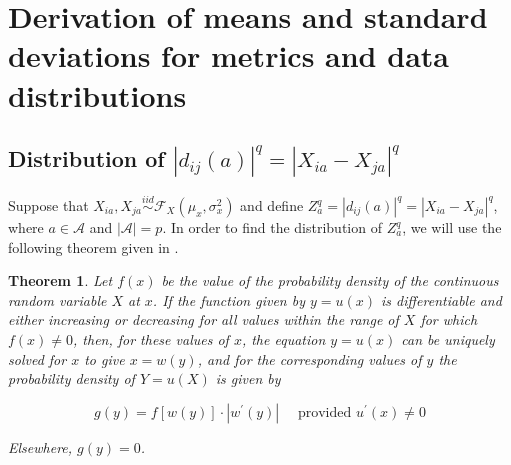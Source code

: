 \documentclass[10pt,letterpaper]{article}\usepackage[]{graphicx}\usepackage[]{color}
\newtheorem{theorem}{Theorem}[section]
\begin{document}
\section{Derivation of means and standard deviations for metrics and data distributions}

\subsection{Distribution of \texorpdfstring{$|d_{ij}(a)|^q = |X_{ia} - X_{ja}|^q$}{}}

Suppose that $X_{ia}, X_{ja} \overset{iid}{\sim} \mathcal{F}_X(\mu_x,\sigma^2_x)$ and define $Z^q_a = |d_{ij}(a)|^q = |X_{ia} - X_{ja}|^q$, where $a \in \mathcal{A}$ and $|\mathcal{A}| = p$. In order to find the distribution of $Z^q_a$, we will use the following theorem given in \cite{freund2004}.

\begin{theorem}\label{thm:freund}
Let $f(x)$ be the value of the probability density of the continuous random variable $X$ at $x$. If the function given by $y = u(x)$ is differentiable and either increasing or decreasing for all values within the range of $X$ for which $f(x) \neq 0$, then, for these values of $x$, the equation $y = u(x)$ can be uniquely solved for $x$ to give $x = w(y)$, and for the corresponding values of $y$ the probability density of $Y = u(X)$ is given by

\[g(y) = f[w(y)] \cdot |w^\prime(y)| \quad \text{ provided } u^\prime(x) \neq 0\]

\noindent Elsewhere, $g(y) = 0$.
\end{theorem}
\end{document}
